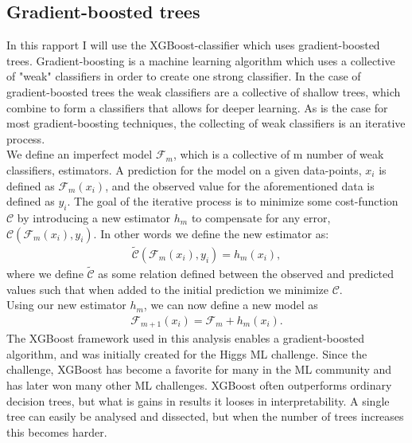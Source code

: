 \documentclass{article}
\begin{document}
\subsection{Gradient-boosted trees \cite{HIGGS}}
In this rapport I will use the XGBoost-classifier which uses gradient-boosted trees. Gradient-boosting is a machine learning algorithm which uses a collective of "weak" classifiers in order to create one strong classifier. In the case of gradient-boosted trees the weak classifiers are a collective of shallow trees, which combine to form a classifiers that allows for deeper learning. As is the case for most gradient-boosting techniques, the collecting of weak classifiers is an iterative process.
\\
We define an imperfect model $\mathcal{F}_m$, which is a collective of m number of weak classifiers, estimators. A prediction for the model on a given data-points, $x_i$ is defined as $\mathcal{F}_m(x_i)$, and the observed value for the aforementioned data is defined as $y_i$. The goal of the iterative process is to minimize some cost-function $\mathcal{C}$ by introducing a new estimator $h_m$ to compensate for any error, $\mathcal{C}(\mathcal{F}_m(x_i), y_i)$. In other words we define the new estimator as:
\begin{align}
    \tilde{\mathcal{C}}(\mathcal{F}_m(x_i), y_i) = h_m(x_i),
\end{align}
where we define $\tilde{\mathcal{C}}$ as some relation defined between the observed and predicted values such that when added to the initial prediction we minimize $\mathcal{C}$.
\\
Using our new estimator $h_m$, we can now define a new model as
\begin{align}
    \mathcal{F}_{m+1}(x_i) = \mathcal{F}_m + h_m (x_i).
\end{align}
The XGBoost \cite{XGB} framework used in this analysis enables a gradient-boosted algorithm, and was initially created for the Higgs ML challenge. Since the challenge, XGBoost has become a favorite for many in the ML community and has later won many other ML challenges. XGBoost often outperforms ordinary decision trees, but what is gains in results it looses in interpretability. A single tree can easily be analysed and dissected, but when the number of trees increases this becomes harder. 
\end{document}
